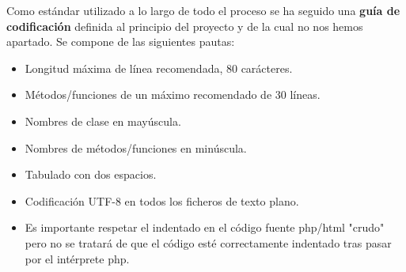 Como estándar utilizado a lo largo de todo el proceso se ha seguido una \textbf{guía de codificación} definida al principio del proyecto y de la cual no nos hemos apartado.
Se compone de las siguientes pautas:

\begin{itemize}
	\item Longitud máxima de línea recomendada, 80 carácteres.
	\item Métodos/funciones de un máximo recomendado de 30 líneas.
	\item Nombres de clase en mayúscula.
	\item Nombres de métodos/funciones en minúscula.
	\item Tabulado con dos espacios.
	\item Codificación UTF-8 en todos los ficheros de texto plano.
	\item Es importante respetar el indentado en el código fuente php/html "crudo" pero no se tratará de que el código esté correctamente indentado tras pasar por el intérprete php.
\end{itemize}









